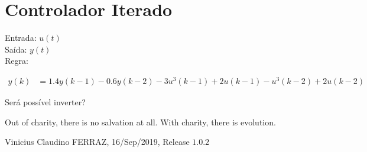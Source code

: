 \documentclass[12pt]{article}
\begin{document}
\section{Controlador Iterado}

\begin{flushleft}
Entrada: $u(t)$ \\
Sa\'ida: $y(t)$ \\
Regra:
\end{flushleft}

\begin{align}
y(k) &= 1.4 y(k-1) - 0.6 y(k-2) - 3 u^3(k -1) + 2u(k-1) - u^3(k-2) + 2u(k-2)
\end{align}

Ser\'a poss\'ivel inverter?

\vspace{3mm}

Out of charity, there is no salvation at all. With charity, there is evolution.

\vspace{3mm}

Vinicius Claudino FERRAZ, 16/Sep/2019, Release $1.0.2$
\end{document}
